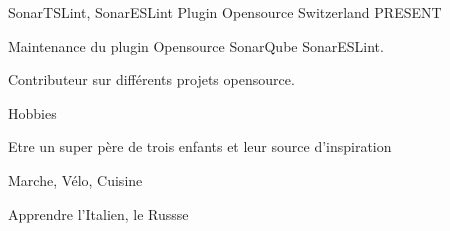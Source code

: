 \begin{cventries}
\cventry
  {SonarTSLint, SonarESLint Plugin} %
  {Opensource} %
  {Switzerland} %
  {PRESENT} %
  {
    \begin{cvitems} %
      \item {Maintenance du plugin Opensource SonarQube  SonarESLint.}
  \item {Contributeur sur différents projets opensource.}
    \end{cvitems}
  }

  \cventry
{Hobbies} %
{} %
{} %
{} %
{
	\begin{cvitems} %
		\item {Etre un super père de trois enfants et leur source d'inspiration}
		\item {Marche, Vélo, Cuisine}
		\item {Apprendre l'Italien, le Russse}
	\end{cvitems}
}

\end{cventries}

